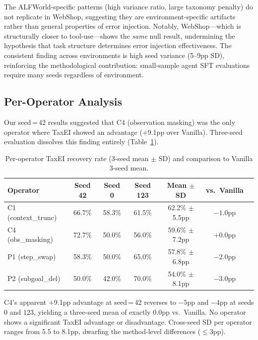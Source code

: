 \documentclass[11pt,a4paper]{article}
\begin{document}
The ALFWorld-specific patterns (high variance ratio, large taxonomy penalty) do not replicate in WebShop, suggesting they are environment-specific artifacts rather than general properties of error injection.
Notably, WebShop---which is structurally closer to tool-use---shows the \emph{same} null result, undermining the hypothesis that task structure determines error injection effectiveness.
The consistent finding across environments is high seed variance (5--9pp SD), reinforcing the methodological contribution: small-sample agent SFT evaluations require many seeds regardless of environment.

\subsection{Per-Operator Analysis}\label{sec:peroperator}

Our seed\,=\,42 results suggested that C4 (observation masking) was the only operator where TaxEI showed an advantage (+9.1pp over Vanilla).
Three-seed evaluation dissolves this finding entirely (Table~\ref{tab:peroperator}).

\begin{table}[h]
\centering
\caption{Per-operator TaxEI recovery rate (3-seed mean $\pm$ SD) and comparison to Vanilla 3-seed mean.}
\label{tab:peroperator}
\begin{tabular}{lcccccc}
\toprule
\textbf{Operator} & \textbf{Seed 42} & \textbf{Seed 0} & \textbf{Seed 123} & \textbf{Mean $\pm$ SD} & \textbf{vs.\ Vanilla} \\
\midrule
C1 (context\_trunc) & 66.7\% & 58.3\% & 61.5\% & 62.2\% $\pm$ 5.5pp & $-1.0$pp \\
C4 (obs\_masking)    & 72.7\% & 50.0\% & 56.0\% & 59.6\% $\pm$ 7.2pp & $+0.0$pp \\
P1 (step\_swap)      & 58.3\% & 50.0\% & 65.0\% & 57.8\% $\pm$ 6.8pp & $-2.0$pp \\
P2 (subgoal\_del)    & 50.0\% & 42.0\% & 70.0\% & 54.0\% $\pm$ 8.1pp & $-3.0$pp \\
\bottomrule
\end{tabular}
\end{table}

C4's apparent +9.1pp advantage at seed\,=\,42 reverses to $-5$pp and $-4$pp at seeds 0 and 123, yielding a three-seed mean of exactly 0.0pp vs.\ Vanilla.
No operator shows a significant TaxEI advantage or disadvantage.
Cross-seed SD per operator ranges from 5.5 to 8.1pp, dwarfing the method-level differences (${\leq}3$pp).
\end{document}
